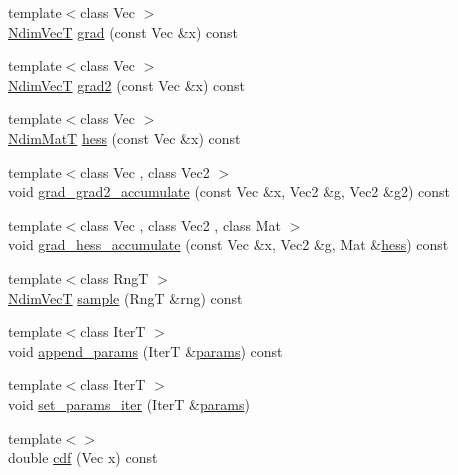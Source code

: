 \begin{DoxyCompactItemize}
\item 
{\footnotesize template$<$class Vec $>$ }\\\hyperlink{classprior__hessian_1_1MultivariateNormalDist_a0f5725cbbfa47be45b2741467dcd5615}{Ndim\+VecT} \hyperlink{classprior__hessian_1_1MultivariateNormalDist_a300193a7fac39d098eafd7b4fef86d05}{grad} (const Vec \&x) const 
\item 
{\footnotesize template$<$class Vec $>$ }\\\hyperlink{classprior__hessian_1_1MultivariateNormalDist_a0f5725cbbfa47be45b2741467dcd5615}{Ndim\+VecT} \hyperlink{classprior__hessian_1_1MultivariateNormalDist_abddd70ca592cc71d9269f227ef53f90a}{grad2} (const Vec \&x) const 
\item 
{\footnotesize template$<$class Vec $>$ }\\\hyperlink{classprior__hessian_1_1MultivariateNormalDist_a2aa1e12ff8819a2cc3a8d3f33bcf8de2}{Ndim\+MatT} \hyperlink{classprior__hessian_1_1MultivariateNormalDist_aaf8d6241c639ee69c7854f392ba85480}{hess} (const Vec \&x) const 
\item 
{\footnotesize template$<$class Vec , class Vec2 $>$ }\\void \hyperlink{classprior__hessian_1_1MultivariateNormalDist_ae51a2d1024d5048d0631929092b26cc7}{grad\+\_\+grad2\+\_\+accumulate} (const Vec \&x, Vec2 \&g, Vec2 \&g2) const 
\item 
{\footnotesize template$<$class Vec , class Vec2 , class Mat $>$ }\\void \hyperlink{classprior__hessian_1_1MultivariateNormalDist_a8cd22c12a8c039623589cc947aba25f0}{grad\+\_\+hess\+\_\+accumulate} (const Vec \&x, Vec2 \&g, Mat \&\hyperlink{classprior__hessian_1_1MultivariateNormalDist_aaf8d6241c639ee69c7854f392ba85480}{hess}) const 
\item 
{\footnotesize template$<$class RngT $>$ }\\\hyperlink{classprior__hessian_1_1MultivariateNormalDist_a0f5725cbbfa47be45b2741467dcd5615}{Ndim\+VecT} \hyperlink{classprior__hessian_1_1MultivariateNormalDist_ad17199c0b81608efff2d1e28714992e8}{sample} (RngT \&rng) const 
\item 
{\footnotesize template$<$class IterT $>$ }\\void \hyperlink{classprior__hessian_1_1MultivariateNormalDist_a58cde72a7fb9ee4c517149cdb25de76d}{append\+\_\+params} (IterT \&\hyperlink{classprior__hessian_1_1MultivariateNormalDist_a55a53ff4ea86375a8971a5334c000c9c}{params}) const 
\item 
{\footnotesize template$<$class IterT $>$ }\\void \hyperlink{classprior__hessian_1_1MultivariateNormalDist_ad4842325329050c2fc4386096b3496dd}{set\+\_\+params\+\_\+iter} (IterT \&\hyperlink{classprior__hessian_1_1MultivariateNormalDist_a55a53ff4ea86375a8971a5334c000c9c}{params})
\item 
{\footnotesize template$<$$>$ }\\double \hyperlink{classprior__hessian_1_1MultivariateNormalDist_aa6e75faa3fd9a23d7194760a713d1563}{cdf} (Vec x) const
\end{DoxyCompactItemize}
